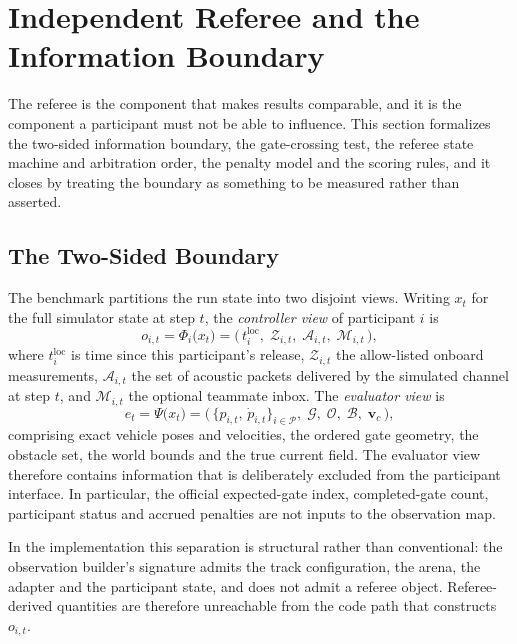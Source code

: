 \section{Independent Referee and the Information Boundary}
\label{sec:referee}

The referee is the component that makes results comparable, and it is the
component a participant must not be able to influence. This section formalizes
the two-sided information boundary, the gate-crossing test, the referee state
machine and arbitration order, the penalty model and the scoring rules, and it
closes by treating the boundary as something to be measured rather than
asserted.

\subsection{The Two-Sided Boundary}
\label{sec:boundary}

The benchmark partitions the run state into two disjoint views. Writing $x_t$ for
the full simulator state at step $t$, the \emph{controller view} of participant
$i$ is
\begin{equation}
\label{eq:controller_view}
o_{i,t} = \Phi_i\big(x_t\big) = \big(\,t^{\mathrm{loc}}_i,\; \mathcal{Z}_{i,t},\; \mathcal{A}_{i,t},\; \mathcal{M}_{i,t}\,\big),
\end{equation}
where $t^{\mathrm{loc}}_i$ is time since this participant's release,
$\mathcal{Z}_{i,t}$ the allow-listed onboard measurements, $\mathcal{A}_{i,t}$
the set of acoustic packets delivered by the simulated channel at step $t$, and
$\mathcal{M}_{i,t}$ the optional teammate inbox. The \emph{evaluator view} is
\begin{equation}
\label{eq:referee_view}
e_t = \Psi\big(x_t\big) = \big(\,\{p_{i,t},\,\dot p_{i,t}\}_{i\in\mathcal{P}},\; \mathcal{G},\; \mathcal{O},\; \mathcal{B},\; \mathbf{v}_c\,\big),
\end{equation}
comprising exact vehicle poses and velocities, the ordered gate geometry, the
obstacle set, the world bounds and the true current field. The evaluator view
therefore contains information that is deliberately excluded from the participant
interface. In particular, the official expected-gate index, completed-gate count,
participant status and accrued penalties are not inputs to the observation map.

In the implementation this separation is structural rather than conventional:
the observation builder's signature admits the track configuration, the arena,
the adapter and the participant state, and does not admit a referee object.
Referee-derived quantities are therefore unreachable from the code path that
constructs $o_{i,t}$.

